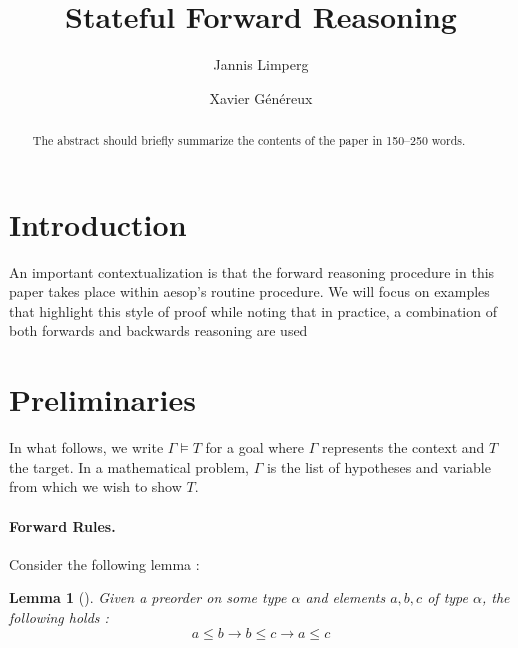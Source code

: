 \documentclass[runningheads]{llncs}
\newtheorem{lem}{Lemma}
\newcommand{\xcom}[1]{{\color{cyan}{Xavier: #1}} }
\begin{document}
\title{Stateful Forward Reasoning}


\author{Jannis Limperg \and
  Xavier Généreux}


\maketitle

\begin{abstract}
The abstract should briefly summarize the contents of the paper in
150--250 words.

\end{abstract}

\section{Introduction}
\xcom{TODO}

\xcom{ Specify the problem (user defined rules)
 + deal with changes with local context}
\xcom{ Talk about aesop}
\xcom{ Do we outline the solution?}

An important contextualization is that the forward reasoning procedure in this paper takes place
within aesop's routine procedure. We will focus on examples that highlight this style of proof
while noting that in practice, a combination of both forwards and backwards reasoning are used 
\section{Preliminaries}

\xcom{Adapt for CADE.}

In what follows, we write $\Gamma \models T$ for a goal where $\Gamma$ represents the context and
$T$ the target. In a mathematical problem, $\Gamma$ is the list of hypotheses and variable from
which we wish to show $T$.

\paragraph{Forward Rules.}
Consider the following lemma :
\begin{lem}[]
  Given a preorder on some type $\alpha$ and elements $a,b,c$ of type $\alpha$, the following holds :
  $$a \leq b \rightarrow b \leq c \rightarrow a \leq c$$
\end{lem}
\end{document}
